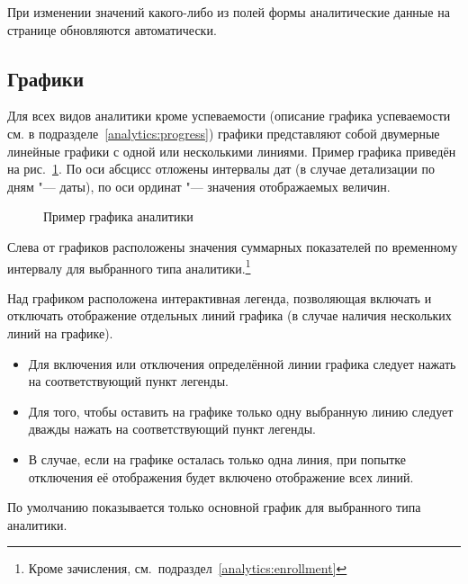 При изменении значений какого-либо из полей формы аналитические данные на странице обновляются автоматически.

\subsection{Графики}
\label{analytics:charts}

Для всех видов аналитики кроме успеваемости (описание графика успеваемости см. в подразделе~\ref{analytics:progress}) 
графики представляют собой двумерные линейные графики с одной или несколькими линиями. Пример графика
приведён на рис.~\ref{analytics:chart}. По оси абсцисс отложены интервалы дат (в случае 
детализации по дням "--- даты), по оси ординат "--- значения отображаемых величин. 

\begin{figure}[H]
	\caption{Пример графика аналитики}
	\label{analytics:chart}
\end{figure}

Слева от графиков расположены значения суммарных показателей по временному интервалу для выбранного 
типа аналитики.\footnote{Кроме зачисления, см.\ подраздел~\ref{analytics:enrollment}}

Над графиком расположена интерактивная легенда, позволяющая включать и отключать отображение отдельных линий
графика (в случае наличия нескольких линий на графике).
\begin{itemize}
	\item Для включения или отключения определённой линии графика следует нажать на соответствующий пункт легенды.
	\item Для того, чтобы оставить на графике только одну выбранную линию следует дважды нажать на соответствующий пункт легенды.
	\item В случае, если на графике осталась только одна линия, при попытке отключения её отображения будет включено отображение всех линий. 
\end{itemize}
По умолчанию показывается только основной график для выбранного типа аналитики.

